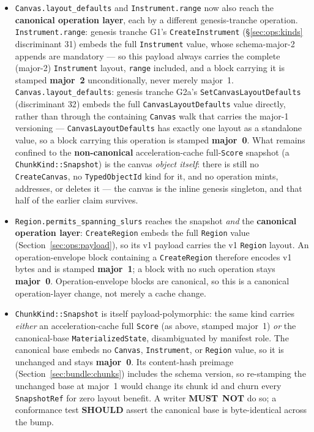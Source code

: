 \documentclass[11pt,letterpaper]{report}
\newcommand{\tablenums}[1]{{\addfontfeatures{Numbers={Lining,Tabular}}#1}}
\newcommand{\MUSTNOT}{\textbf{MUST}\nobreak\ \textbf{NOT}}
\newcommand{\SHOULD}{\textbf{SHOULD}}
\begin{document}
\begin{itemize}
  \item \texttt{Canvas.layout\_defaults} and \texttt{Instrument.range} now
    also reach the \textbf{canonical operation layer}, each by a different
    genesis-tranche operation. \texttt{Instrument.range}: genesis tranche G1's
    \texttt{CreateInstrument} (\S\ref{sec:ops:kinds} discriminant
    \tablenums{31}) embeds the full \texttt{Instrument} value, whose
    schema-major-2 appends are mandatory --- so this payload always carries
    the complete (major-2) \texttt{Instrument} layout, \texttt{range}
    included, and a block carrying it is stamped \textbf{major~2}
    unconditionally, never merely major~1.
    \texttt{Canvas.layout\_defaults}: genesis tranche G2a's
    \texttt{SetCanvasLayoutDefaults} (discriminant \tablenums{32}) embeds the
    full \texttt{CanvasLayoutDefaults} value directly, rather than through the
    containing \texttt{Canvas} walk that carries the major-1 versioning ---
    \texttt{CanvasLayoutDefaults} has exactly one layout as a standalone
    value, so a block carrying this operation is stamped \textbf{major~0}.
    What remains confined to the \textbf{non-canonical} acceleration-cache
    full-\texttt{Score} snapshot (a \texttt{ChunkKind::Snapshot}) is the
    canvas \emph{object itself}: there is still no \texttt{CreateCanvas}, no
    \texttt{TypedObjectId} kind for it, and no operation mints, addresses, or
    deletes it --- the canvas is the inline genesis singleton, and that half
    of the earlier claim survives.
  \item \texttt{Region.permits\_spanning\_slurs} reaches the snapshot
    \emph{and} the \textbf{canonical operation layer}:
    \texttt{CreateRegion} embeds the full \texttt{Region} value
    (Section~\ref{sec:ops:payload}), so its v1 payload carries the v1
    \texttt{Region} layout. An operation-envelope block containing a
    \texttt{CreateRegion} therefore encodes v1 bytes and is stamped
    \textbf{major~1}; a block with no such operation stays \textbf{major~0}.
    Operation-envelope blocks are canonical, so this is a canonical
    operation-layer change, not merely a cache change.
  \item \texttt{ChunkKind::Snapshot} is itself payload-polymorphic: the same
    kind carries \emph{either} an acceleration-cache full \texttt{Score} (as
    above, stamped major~1) \emph{or} the canonical-base
    \texttt{MaterializedState}, disambiguated by manifest role. The canonical
    base embeds no \texttt{Canvas}, \texttt{Instrument}, or \texttt{Region}
    value, so it is unchanged and stays \textbf{major~0}. Its content-hash
    preimage (Section~\ref{sec:bundle:chunks}) includes the schema version, so
    re-stamping the unchanged base at major~1 would change its chunk id and
    churn every \texttt{SnapshotRef} for zero layout benefit. A writer
    \MUSTNOT{} do so; a conformance test \SHOULD{} assert the canonical base
    is byte-identical across the bump.
\end{itemize}
\end{document}
